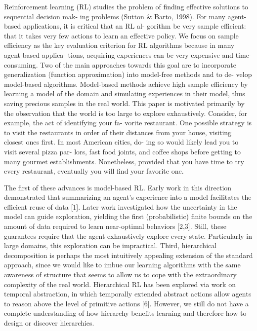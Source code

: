 \documentclass{article} %
\begin{document}
Reinforcement learning (RL) studies the problem of
finding effective solutions to sequential decision mak-
ing problems (Sutton & Barto, 1998). For many
agent-based applications, it is critical that an RL al-
gorithm be very sample efficient: that it takes very
few actions to learn an effective policy. We focus on
sample efficiency as the key evaluation criterion for
RL algorithms because in many agent-based applica-
tions, acquiring experiences can be very expensive and
time-consuming. Two of the main approaches towards
this goal are to incorporate generalization (function
approximation) into model-free methods and to de-
velop model-based algorithms. Model-based methods
achieve high sample efficiency by learning a model of
the domain and simulating experiences in their model,
thus saving precious samples in the real world.
This paper is motivated primarily by the observation
that the world is too large to explore exhaustively.
Consider, for example, the act of identifying your fa-
vorite restaurant. One possible strategy is to visit the
restaurants in order of their distances from your house,
visiting closest ones first. In most American cities, do-
ing so would likely lead you to visit several pizza par-
lors, fast food joints, and coffee shops before getting to
many gourmet establishments. Nonetheless, provided
that you have time to try every restaurant, eventually
you will find your favorite one.

The first of these advances is model-based RL. Early work in this direction
demonstrated that summarizing an agent’s experience into a model facilitates
the efficient reuse of data [1]. Later work investigated how the uncertainty in
the model can guide exploration, yielding the first (probabilistic) finite bounds
on the amount of data required to learn near-optimal behaviors [2,3]. Still, these
guarantees require that the agent exhaustively explore every state. Particularly
in large domains, this exploration can be impractical.
Third, hierarchical decomposition is perhaps the most intuitively appealing
extension of the standard approach, since we would like to imbue our learning
algorithms with the same awareness of structure that seems to allow us to
cope with the extraordinary complexity of the real world. Hierarchical RL has
been explored via work on temporal abstraction, in which temporally extended
abstract actions allow agents to reason above the level of primitive actions [6].
However, we still do not have a complete understanding of how hierarchy benefits
learning and therefore how to design or discover hierarchies.
\end{document}
